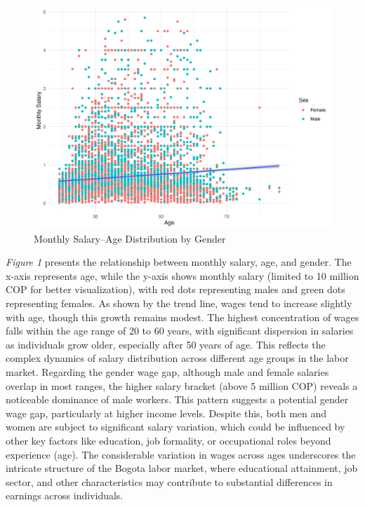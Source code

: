 \documentclass[11pt,a4paper,onecolumn]{article}
\begin{document}
    \begin{figure}[H]
        \includegraphics[scale=0.7]{../views/P01_salary_age_sex.png}   
        \caption{Monthly Salary--Age Distribution by Gender} \label{fig:P01}
    \end{figure}

     \textit{Figure 1} presents the relationship between monthly salary, age, and gender. The x-axis represents age, while the y-axis shows monthly salary (limited to 10 million COP for better visualization), with red dots representing males and green dots representing females. As shown by the trend line, wages tend to increase slightly with age, though this growth remains modest. The highest concentration of wages falls within the age range of 20 to 60 years, with significant dispersion in salaries as individuals grow older, especially after 50 years of age. This reflects the complex dynamics of salary distribution across different age groups in the labor market. Regarding the gender wage gap, although male and female salaries overlap in most ranges, the higher salary bracket (above 5 million COP) reveals a noticeable dominance of male workers. This pattern suggests a potential gender wage gap, particularly at higher income levels. Despite this, both men and women are subject to significant salary variation, which could be influenced by other key factors like education, job formality, or occupational roles beyond experience (age). The considerable variation in wages across ages underscores the intricate structure of the Bogota labor market, where educational attainment, job sector, and other characteristics may contribute to substantial differences in earnings across individuals.
\end{document}
